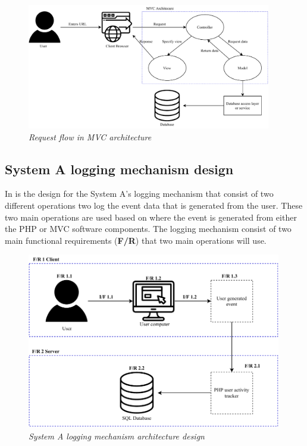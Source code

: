 \begin{figure}[!htb] %
	\centering %
	\includegraphics[width=0.95\textwidth]{Images/Chapter2/Flow_MVC_Architecture/Flow_MVC_Architecture.pdf}
	\caption[Request flow in MVC architecture]
	{\textit{Request flow in MVC architecture \cite{Gu2010}}}\label{fig:ch2_Flow_MVC_Architecture}
\end{figure}

\clearpage

\subsection{System A logging mechanism design}

In  is the design for the System A's logging mechanism that consist of two different operations two log the event data that is generated from the user. These two main operations are used based on where the event is generated from either the PHP or MVC software components. The logging mechanism consist of two main functional requirements (\textbf{F/R}) that two main operations will use.

\begin{figure}[!htb] %
	\centering %
	\includegraphics[width=0.99\textwidth]{Images/Chapter2/SystemA_Architecture_Diagram/SystemA_Architecture_Diagram.pdf}
	\caption[System A logging mechanism architecture design]
	{\textit{System A logging mechanism architecture design}}\label{fig:ch2_SystemA_Arch_Design}
\end{figure}

